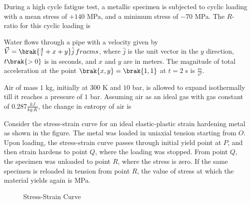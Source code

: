 \item During a high cycle fatigue test, a metallic specimen is subjected to cyclic loading with a mean stress of $+140$ MPa, and a minimum stress of $-70$ MPa. The $R$-ratio  for this cyclic loading is 
    
\item Water flows through a pipe with a velocity given by $\vec{V} = \brak{ \frac{4}{t} + x + y } \hat{j} \, frac{m}{s}$, where $\hat{j}$ is the unit vector in the $y$ direction, $t \brak{ > 0 }$ is in seconds, and $x$ and $y$ are in meters. The magnitude of total acceleration at the point $\brak{ x, y } = \brak{ 1, 1 }$ at $t = 2$ s is  $\frac{m}{s^2}$.
    
\item Air of mass $1$ kg, initially at $300$ K and $10$ bar, is allowed to expand isothermally till it reaches a pressure of $1$ bar. Assuming air as an ideal gas with gas constant of $0.287 \frac{kJ}{kg.K}$, the change in entropy of air is 

\item Consider the stress-strain curve for an ideal elastic-plastic strain hardening metal as shown in the figure. The metal was loaded in uniaxial tension starting from $O$. Upon loading, the stress-strain curve passes through initial yield point at $P$, and then strain hardens to point $Q$, where the loading was stopped. From point $Q$, the specimen was unloaded to point $R$, where the stress is zero. If the same specimen is reloaded in tension from point $R$, the value of stress at which the material yields again is MPa.

\begin{figure}[!ht]
\centering
{}
\caption{Stress-Strain Curve}
\end{figure}

